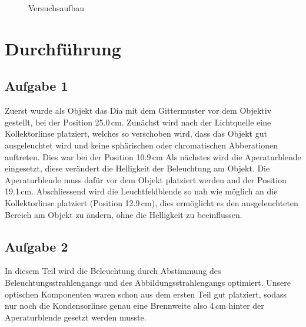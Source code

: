 \documentclass[11pt,a4paper]{article}
\begin{document}
\begin{figure}
\centering
{
\caption{Versuchsaufbau \cite{Anleitung}}
\label{Pic:X}}
\end{figure}


\section{Durchführung}

\subsection{Aufgabe 1}

Zuerst wurde als Objekt das Dia mit dem Gittermuster vor dem Objektiv gestellt, bei der Position 25.0\,cm. Zunächst wird nach der Lichtquelle eine Kollektorlinse platziert, welches so verschoben wird, dass das Objekt gut ausgeleuchtet wird und keine sphärischen oder chromatischen Abberationen auftreten. Dies war bei der Position 10.9\,cm Als nächstes wird die Aperaturblende eingesetzt, diese verändert die Helligkeit der Beleuchtung am Objekt. Die Aperaturblende muss dafür vor dem Objekt platziert werden and der Position 19.1\,cm. Abschliessend wird die Leuchtfeldblende so nah wie möglich an die Kollektorlinse platziert (Position 12.9\,cm), dies ermöglicht es den ausgeleuchteten Bereich am Objekt zu ändern, ohne die Helligkeit zu beeinflussen. 

\subsection{Aufgabe 2}

In diesem Teil wird die Beleuchtung durch Abstimmung des Beleuchtungsstrahlengangs und des Abbildungsstrahlengangs optimiert. Unsere optischen Komponenten waren schon aus dem ersten Teil gut platziert, sodass nur noch die Kondensorlinse genau eine Brennweite also 4\,cm hinter der Aperaturblende gesetzt werden musste.
\end{document}
